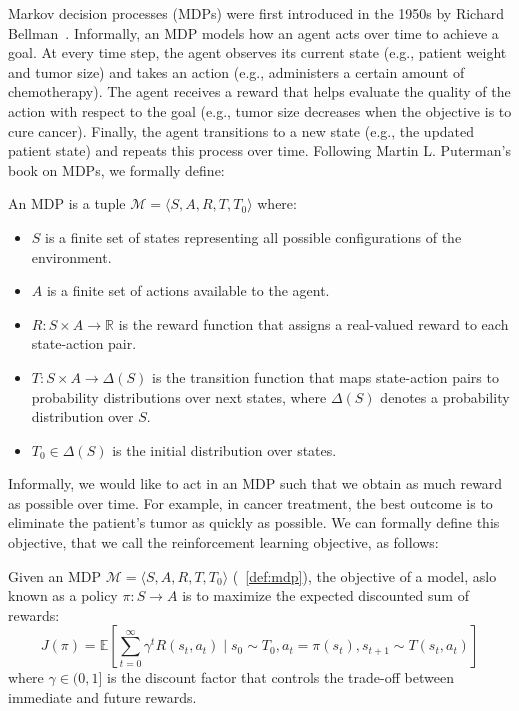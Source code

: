Markov decision processes (MDPs) were first introduced in the 1950s by Richard Bellman~\cite{Bellman}.
Informally, an MDP models how an agent acts over time to achieve a goal. 
At every time step, the agent observes its current state (e.g., patient weight and tumor size) and takes an action (e.g., administers a certain amount of chemotherapy).
The agent receives a reward that helps evaluate the quality of the action with respect to the goal (e.g., tumor size decreases when the objective is to cure cancer).
Finally, the agent transitions to a new state (e.g., the updated patient state) and repeats this process over time. 
Following Martin L. Puterman's book on MDPs\cite{puterman}, we formally define:
\begin{definition}\label{def:mdp} An MDP is a tuple $\mathcal{M} = \langle S, A, R, T, T_0 \rangle$ where:
\begin{itemize}
\item $S$ is a finite set of states representing all possible configurations of the environment.
\item $A$ is a finite set of actions available to the agent.
\item $R: S \times A \rightarrow \mathbb{R}$ is the reward function that assigns a real-valued reward to each state-action pair.
\item $T: S \times A \rightarrow \Delta(S)$ is the transition function that maps state-action pairs to probability distributions over next states, where $\Delta(S)$ denotes a probability distribution over $S$.
\item $T_0 \in \Delta(S)$ is the initial distribution over states.
\end{itemize}
\end{definition}

Informally, we would like to act in an MDP such that we obtain as much reward as possible over time.
For example, in cancer treatment, the best outcome is to eliminate the patient's tumor as quickly as possible.
We can formally define this objective, that we call the reinforcement learning objective, as follows:

\begin{definition}\label{def:mdp-obj} Given an MDP $\mathcal{M}=\langle S, A, R, T, T_0 \rangle$ (~\ref{def:mdp}), the objective of a model, aslo known as a policy $\pi: S \rightarrow A$ is to maximize the expected discounted sum of rewards:
$$J(\pi) = \mathbb{E}\left[\sum_{t=0}^{\infty} \gamma^t R(s_t, a_t) \mid s_0 \sim T_0, a_t = \pi(s_t), s_{t+1} \sim T(s_t, a_t)\right]$$
where $\gamma \in (0,1]$ is the discount factor that controls the trade-off between immediate and future rewards.
\end{definition}

